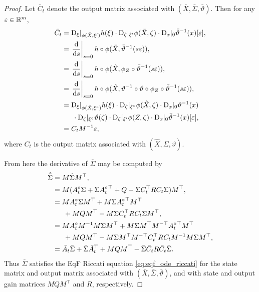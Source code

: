 \documentclass{article}
\newcommand\at[2]{\left.#1\right|_{#2}}
\newcommand{\dds}{\frac{\td}{\td s}}
\begin{document}
\begin{proof}
Let $\bar{C}_t$ denote the output matrix associated with $(\bar{X}, \bar{\Sigma}, \bar{\vartheta})$.
Then for any $\varepsilon \in \mathbb{R}^m$,
\begin{align*}
    \bar{C}_t
    &= \tD_\xi |_{\phi(\bar{X}, \xi')} h(\xi) \cdot \tD_\zeta |_{\xi'} \phi(\bar{X}, \zeta) \cdot \tD_x |_0 \bar{\vartheta}^{-1} (x)[\varepsilon], \\
    &= \at{\dds}{s=0} h \circ \phi(\bar{X}, \bar{\vartheta}^{-1} (s \varepsilon)), \\
    &= \at{\dds}{s=0} h \circ \phi(\hat{X}, \phi_Z \circ \bar{\vartheta}^{-1} (s \varepsilon)), \\
    &= \at{\dds}{s=0} h \circ \phi(\hat{X}, \vartheta^{-1} \circ \vartheta \circ \phi_Z \circ \bar{\vartheta}^{-1} (s \varepsilon)), \\
    &= \tD_\xi |_{\phi(\hat{X}, \mr{\xi})} h(\xi)
    \cdot \tD_\zeta |_{\mr{\xi}} \phi(\hat{X}, \zeta)
    \cdot \tD_x |_0 \vartheta^{-1} (x)
    \\ &\phantom{==}
    \cdot \tD_\zeta |_{\mr{\xi}} \vartheta(\zeta)
    \cdot \tD_\zeta | _{\xi'} \phi(Z, \zeta)
    \cdot \tD_x |_0 \bar{\vartheta}^{-1}(x)[\varepsilon], \\
    &= C_t M^{-1} \varepsilon,
\end{align*}
where $C_t$ is the output matrix associated with $(\hat{X}, \Sigma, \vartheta)$.

From here the derivative of $\bar{\Sigma}$ may be computed by
\begin{align*}
    \dot{\bar{\Sigma}}
    &= M \dot{\Sigma} M^\top, \\
    &= M ({A}^\circ_t \Sigma + \Sigma {{A}^\circ_t}^\top + Q - \Sigma C_t^\top R C_t \Sigma) M^\top, \\
    &= M {A}^\circ_t \Sigma M^\top + M \Sigma {{A}^\circ_t}^\top M^\top 
    \\ &\phantom{==}
    + M Q M^\top - M \Sigma C_t^\top R C_t \Sigma M^\top, \\
    &= M {A}^\circ_t M^{-1} M \Sigma M^\top + M \Sigma M^\top M^{-\top} {{A}^\circ_t}^\top M^\top 
    \\ &\phantom{==}
    + M Q M^\top - M \Sigma M^\top M^{-\top} C_t^\top R C_t M^{-1} M \Sigma M^\top, \\
    &= \bar{A}_t \bar{\Sigma} + \bar{\Sigma} \bar{A}_t^\top 
    + M Q M^\top - \bar{\Sigma} \bar{C}_t R \bar{C}_t \bar{\Sigma}.
\end{align*}
Thus $\bar{\Sigma}$ satisfies the EqF Riccati equation \eqref{eq:eqf_ode_riccati} for the state matrix and output matrix associated with $(\bar{X}, \bar{\Sigma}, \bar{\vartheta})$, and with state and output gain matrices $M Q M^\top$ and $R$, respectively.


\end{proof}
\end{document}
